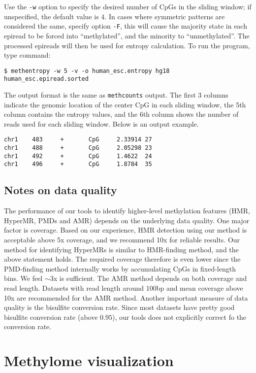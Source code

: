 \documentclass[10pt]{article}
\newcommand{\prog}[1]{\texttt{#1}}
\newcommand{\op}[1]{\texttt{#1}}
\begin{document}
{{Use the \op{-w} option to specify the desired number of CpGs
in the sliding window; if unspecified, the default value is $4$. In
cases where symmetric patterns are considered the same, specify option
\op{-F}, this will cause the majority state in each epiread to be
forced into ``methylated'', and the minority to ``unmethylated''. The
processed epireads will then be used for entropy calculation. To run
the program, type command:
\begin{verbatim}
$ methentropy -w 5 -v -o human_esc.entropy hg18 human_esc.epiread.sorted
\end{verbatim} 
The output format is the same as \prog{methcounts} output. The first 3
columns indicate the genomic location of the center CpG in each
sliding window, the 5th column contains the entropy values, and the
6th column shows the number of reads used for each sliding
window. Below is an output example.
\begin{verbatim}
chr1    483     +       CpG     2.33914 27
chr1    488     +       CpG     2.05298 23
chr1    492     +       CpG     1.4622  24
chr1    496     +       CpG     1.8784  35
\end{verbatim}


\subsection{Notes on data quality}
\label{sec:notes-data-quality}
The performance of our tools to identify higher-level methylation
features (HMR, HyperMR, PMDs and AMR) depends on the underlying data
quality. One major factor is coverage. Based on our experience, HMR
detection using our method is acceptable above 5x coverage, and we
recommend 10x for reliable results. Our method for identifying
HyperMRs is similar to HMR-finding method, and the above statement
holds. The required coverage therefore is even lower since the
PMD-finding method internally works by accumulating CpGs in
fixed-length bins. We feel $\sim$3x is sufficient. The AMR method
depends on both coverage and read length. Datasets with read length
around 100bp and mean coverage above 10x are recommended for the AMR
method. Another important measure of data quality is the bisulfite
conversion rate. Since most datasets have pretty good bisulfite
conversion rate (above $0.95$), our tools does not explicitly correct
fo the conversion rate.

\section{Methylome visualization}
\label{sec:visualization}

}}
\end{document}

